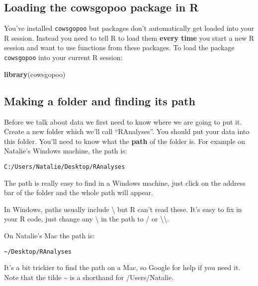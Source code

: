 \documentclass[12pt]{article}
\newcommand{\KeywordTok}[1]{\textcolor[rgb]{0.13,0.29,0.53}{\textbf{{#1}}}}
\newcommand{\NormalTok}[1]{{#1}}
\begin{document}
\subsection{Loading the cowsgopoo package in R}

You've installed \texttt{cowsgopoo} but packages don't automatically get loaded
into your R session. Instead you need to tell R to load them \textbf{every
time} you start a new R session and want to use functions from these
packages. To load the package \texttt{cowsgopoo} into your current R session:

\begin{snugshade}
\begin{Highlighting}[]
\KeywordTok{library}\NormalTok{(cowsgopoo)}
\end{Highlighting}
\end{snugshade}

\subsection{Making a folder and finding its path}

Before we talk about data we first need to know where we are going to put it.
Create a new folder which we'll call
``RAnalyses''. You should put your data into this folder. 
You'll need to know what the \textbf{path} of the folder is. 
For example on Natalie's Windows machine, the path is:

\begin{snugshade}
\texttt{C:/Users/Natalie/Desktop/RAnalyses}
\end{snugshade}

The path is really easy to find in a Windows machine, just click on the
address bar of the folder and the whole path will appear.

\begin{framed}
In Windows, paths usually include \textbackslash{} but R
can't read these. It's easy to fix in your R code, just change any \textbackslash{} in
the path to / or \textbackslash{}\textbackslash{}.
\end{framed}

On Natalie's Mac the path is:

\begin{snugshade}
\texttt{\textasciitilde{}/Desktop/RAnalyses}
\end{snugshade}

It's a bit trickier to find the path on a Mac, so Google for help if you need it. 
Note that the tilde \textasciitilde{} is a shorthand for /Users/Natalie. 
\end{document}
